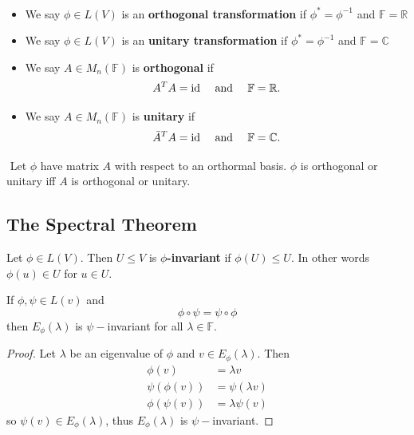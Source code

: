 \begin{definition} $ $

  \begin{itemize}
  \item We say $\phi \in L(V)$ is an {\bf orthogonal transformation} if $\phi^* = \phi^{-1}$ and $\mathbb{F} = \mathbb{R}$
  \item We say $\phi \in L(V)$ is an {\bf unitary transformation} if $\phi^* = \phi^{-1}$ and $\mathbb{F} = \mathbb{C}$

  \item We say $A \in M_n(\mathbb{F})$ is {\bf orthogonal} if
    \[A^T A = \mathrm{id} \quad \text{ and } \quad \mathbb{F}= \mathbb{R}.\]
  \item We say $A \in M_n(\mathbb{F})$ is {\bf unitary} if
    \[\bar{A}^T A = \mathrm{id} \quad \text{ and } \quad \mathbb{F} =\mathbb{C}.\]
  \end{itemize}
\end{definition}

\begin{remark} $ $
    Let $\phi$ have matrix $A$ with respect to an orthormal basis. $\phi$ is orthogonal or unitary iff $A$ is orthogonal or unitary.
\end{remark}

\subsection{The Spectral Theorem}

\begin{definition}
  Let $\phi \in L(V)$. Then $U \leq V$ is {\bf $\phi$-invariant} if $\phi(U) \leq U$. In other words $\phi(u) \in U$ for $u \in U$.
\end{definition}

\begin{lemma}
    If $\phi, \psi \in L(v)$ and
    \[\phi \circ \psi = \psi \circ \phi\]
    then $E_\phi(\lambda)$ is $\psi-$invariant for all $\lambda \in \mathbb{F}$.
\end{lemma}
\begin{proof}
    Let $\lambda$ be an eigenvalue of $\phi$ and $v \in E_\phi(\lambda)$. Then
    \begin{align*}
      \phi(v) &= \lambda v \\
      \psi( \phi(v)) &= \psi( \lambda v) \\
      \phi (\psi(v)) &= \lambda \psi(v)
    \end{align*}
    so $\psi(v) \in E_\phi(\lambda)$, thus $E_\phi(\lambda)$ is $\psi-$invariant.
\end{proof}

